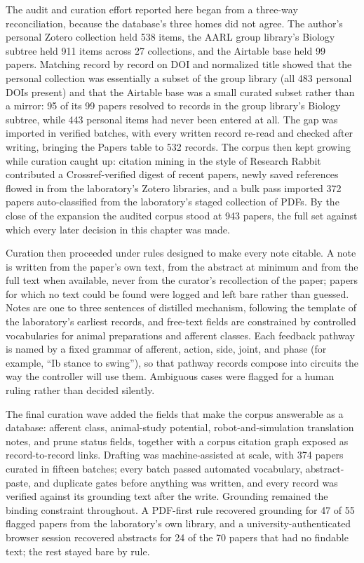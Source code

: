 The audit and curation effort reported here began from a three-way reconciliation, because the database's three homes did not agree. The author's personal Zotero collection held 538 items, the AARL group library's Biology subtree held 911 items across 27 collections, and the Airtable base held 99 papers. Matching record by record on DOI and normalized title showed that the personal collection was essentially a subset of the group library (all 483 personal DOIs present) and that the Airtable base was a small curated subset rather than a mirror: 95 of its 99 papers resolved to records in the group library's Biology subtree, while 443 personal items had never been entered at all. The gap was imported in verified batches, with every written record re-read and checked after writing, bringing the Papers table to 532 records. The corpus then kept growing while curation caught up: citation mining in the style of Research Rabbit contributed a Crossref-verified digest of recent papers, newly saved references flowed in from the laboratory's Zotero libraries, and a bulk pass imported 372 papers auto-classified from the laboratory's staged collection of PDFs. By the close of the expansion the audited corpus stood at 943 papers, the full set against which every later decision in this chapter was made.

Curation then proceeded under rules designed to make every note citable. A note is written from the paper's own text, from the abstract at minimum and from the full text when available, never from the curator's recollection of the paper; papers for which no text could be found were logged and left bare rather than guessed. Notes are one to three sentences of distilled mechanism, following the template of the laboratory's earliest records, and free-text fields are constrained by controlled vocabularies for animal preparations and afferent classes. Each feedback pathway is named by a fixed grammar of afferent, action, side, joint, and phase (for example, ``Ib stance to swing''), so that pathway records compose into circuits the way the controller will use them. Ambiguous cases were flagged for a human ruling rather than decided silently.

The final curation wave added the fields that make the corpus answerable as a database: afferent class, animal-study potential, robot-and-simulation translation notes, and prune status fields, together with a corpus citation graph exposed as record-to-record links. Drafting was machine-assisted at scale, with 374 papers curated in fifteen batches; every batch passed automated vocabulary, abstract-paste, and duplicate gates before anything was written, and every record was verified against its grounding text after the write. Grounding remained the binding constraint throughout. A PDF-first rule recovered grounding for 47 of 55 flagged papers from the laboratory's own library, and a university-authenticated browser session recovered abstracts for 24 of the 70 papers that had no findable text; the rest stayed bare by rule.

